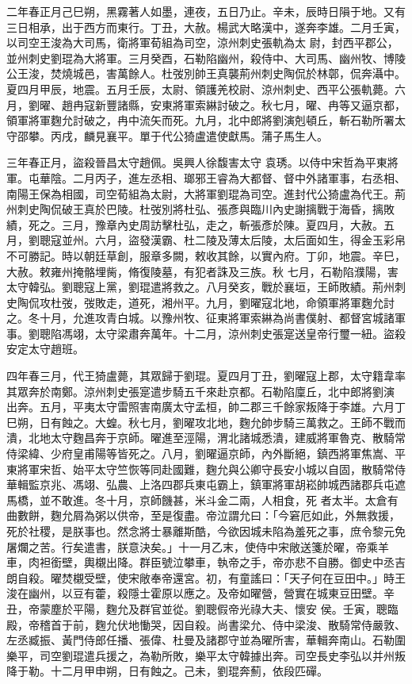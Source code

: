 \begin{pinyinscope}
 二年春正月己巳朔，黑霧著人如墨，連夜，五日乃止。辛未，辰時日隕于地。又有三日相承，出于西方而東行。丁丑，大赦。楊武大略漢中，遂奔李雄。二月壬寅，以司空王浚為大司馬，衛將軍荀組為司空，涼州刺史張軌為太
 尉，封西平郡公，並州刺史劉琨為大將軍。三月癸酉，石勒陷幽州，殺侍中、大司馬、幽州牧、博陵公王浚，焚燒城邑，害萬餘人。杜弢別帥王真襲荊州刺史陶侃於林鄣，侃奔灄中。夏四月甲辰，地震。五月壬辰，太尉、領護羌校尉、涼州刺史、西平公張軌薨。六月，劉曜、趙冉寇新豐諸縣，安東將軍索綝討破之。秋七月，曜、冉等又逼京都，領軍將軍麴允討破之，冉中流矢而死。九月，北中郎將劉演剋頓丘，斬石勒所署太守邵攀。丙戌，麟見襄平。單于代公猗盧遣使獻馬。蒲子馬生人。



 三年春正月，盜殺晉昌太守趙佩。吳興人徐馥害太守
 袁琇。以侍中宋哲為平東將軍。屯華陰。二月丙子，進左丞相、瑯邪王睿為大都督、督中外諸軍事，右丞相、南陽王保為相國，司空荀組為太尉，大將軍劉琨為司空。進封代公猗盧為代王。荊州刺史陶侃破王真於巴陵。杜弢別將杜弘、張彥與臨川內史謝摛戰于海昏，摛敗績，死之。三月，豫章內史周訪擊杜弘，走之，斬張彥於陳。夏四月，大赦。五月，劉聰寇並州。六月，盜發漢霸、杜二陵及薄太后陵，太后面如生，得金玉彩帛不可勝記。時以朝廷草創，服章多闕，敕收其餘，以實內府。丁卯，地震。辛巳，大赦。敕雍州掩骼埋胔，脩復陵墓，有犯者誅及三族。秋
 七月，石勒陷濮陽，害太守韓弘。劉聰寇上黨，劉琨遣將救之。八月癸亥，戰於襄垣，王師敗績。荊州刺史陶侃攻杜弢，弢敗走，道死，湘州平。九月，劉曜寇北地，命領軍將軍麴允討之。冬十月，允進攻青白城。以豫州牧、征東將軍索綝為尚書僕射、都督宮城諸軍事。劉聰陷馮翊，太守梁肅奔萬年。十二月，涼州刺史張寔送皇帝行璽一紐。盜殺安定太守趙班。



 四年春三月，代王猗盧薨，其眾歸于劉琨。夏四月丁丑，劉曜寇上郡，太守籍韋率其眾奔於南鄭。涼州刺史張寔遣步騎五千來赴京都。石勒陷廩丘，北中郎將劉演
 出奔。五月，平夷太守雷照害南廣太守孟桓，帥二郡三千餘家叛降于李雄。六月丁巳朔，日有蝕之。大蝗。秋七月，劉曜攻北地，麴允帥步騎三萬救之。王師不戰而潰，北地太守麴昌奔于京師。曜進至涇陽，渭北諸城悉潰，建威將軍魯克、散騎常侍梁緯、少府皇甫陽等皆死之。八月，劉曜逼京師，內外斷絕，鎮西將軍焦嵩、平東將軍宋哲、始平太守竺恢等同赴國難，麴允與公卿守長安小城以自固，散騎常侍華輯監京兆、馮翊、弘農、上洛四郡兵東屯霸上，鎮軍將軍胡崧帥城西諸郡兵屯遮馬橋，並不敢進。冬十月，京師饑甚，米斗金二兩，人相食，死
 者太半。太倉有曲數餅，麴允屑為粥以供帝，至是復盡。帝泣謂允曰：「今窘厄如此，外無救援，死於社稷，是朕事也。然念將士暴離斯酷，今欲因城未陷為羞死之事，庶令黎元免屠爛之苦。行矣遣書，朕意決矣。」十一月乙末，使侍中宋敞送箋於曜，帝乘羊車，肉袒銜壁，輿櫬出降。群臣號泣攀車，執帝之手，帝亦悲不自勝。御史中丞吉朗自殺。曜焚櫬受壁，使宋敞奉帝還宮。初，有童謠曰：「天子何在豆田中。」時王浚在幽州，以豆有藿，殺隱士霍原以應之。及帝如曜營，營實在城東豆田壁。辛丑，帝蒙塵於平陽，麴允及群官並從。劉聰假帝光祿大夫、懷安
 侯。壬寅，聰臨殿，帝稽首于前，麴允伏地慟哭，因自殺。尚書梁允、侍中梁浚、散騎常侍嚴敦、左丞臧振、黃門侍郎任播、張偉、杜曼及諸郡守並為曜所害，華輯奔南山。石勒圍樂平，司空劉琨遣兵援之，為勒所敗，樂平太守韓據出奔。司空長史李弘以并州叛降于勒。十二月甲申朔，日有蝕之。己未，劉琨奔薊，依段匹磾。




\end{pinyinscope}
